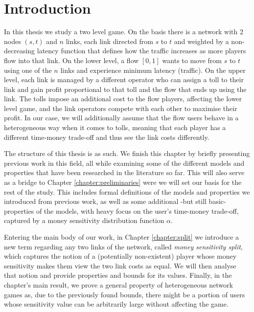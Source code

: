 \documentclass[10pt,a4paper]{book}
\theoremstyle{definition}
\theoremstyle{comment}
\begin{document}
\clearpage

\thispagestyle{empty}
\null
\clearpage

\pagestyle{fancy}

\tableofcontents
\clearpage

\thispagestyle{empty}
\null
\clearpage



\chapter{Introduction}
\label{chapter:intro}

In this thesis we study a two level game.
On the basis there is a network with 2 nodes $(s, t)$ and $n$ links, each link directed from $s$ to $t$ and weighted by a non-decreasing latency function that defines how the traffic increases as more players flow into that link.
On the lower level, a flow $[0, 1]$ wants to move from $s$ to $t$ using one of the $n$ links and experience minimum latency (traffic).
On the upper level, each link is managed by a different operator who can assign a toll to their link and gain profit proportional to that toll and the flow that ends up using the link.
The tolls impose an additional cost to the flow players, affecting the lower level game, and the link operators compete with each other to maximise their profit.
In our case, we will additionally assume that the flow users behave in a heterogeneous way when it comes to tolls, meaning that each player has a different time-money trade-off and thus see the link costs differently.

The structure of this thesis is as such.
We finish this chapter by briefly presenting previous work in this field, all while examining some of the different models and properties that have been researched in the literature so far.
This will also serve as a bridge to Chapter \ref{chapter:preliminaries} were we will set our basis for the rest of the study.
This includes formal definitions of the models and properties we introduced from previous work, as well as some additional -but still basic- properties of the models, with heavy focus on the user's time-money trade-off, captured by a money sensitivity distribution function $\alpha$.

Entering the main body of our work, in Chapter \ref{chapter:split} we introduce a new term regarding any two links of the network, called \textit{money sensitivity split}, which captures the notion of a (potentially non-existent) player whose money sensitivity makes them view the two link costs as equal.
We will then analyse that notion and provide properties and bounds for its values.
Finally, in the chapter's main result, we prove a general property of heterogeneous network games as, due to the previously found bounds, there might be a portion of users whose sensitivity value can be arbitrarily large without affecting the game.
\end{document}
